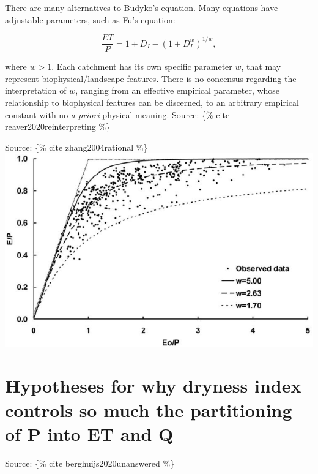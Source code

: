 \documentclass[
  letterpaper,
  DIV=11,
  numbers=noendperiod]{scrreprt}
\begin{document}
There are many alternatives to Budyko's equation. Many equations have
adjustable parameters, such as Fu's equation:

\[
\frac{ET}{P} = 1 + D_I - (1 + D_I^w)^{1/w},
\]

where \(w>1\). Each catchment has its own specific parameter \(w\), that
may represent biophysical/landscape features. There is no concensus
regarding the interpretation of \(w\), ranging from an effective
empirical parameter, whose relationship to biophysical features can be
discerned, to an arbitrary empirical constant with no \emph{a priori}
physical meaning. Source: \{\% cite reaver2020reinterpreting \%\}

Source: \{\% cite zhang2004rational \%\}\\
\includegraphics{archive/figures/zhang-2004-fig7.png}

\hypertarget{hypotheses-for-why-dryness-index-controls-so-much-the-partitioning-of-p-into-et-and-q}{%
\section{Hypotheses for why dryness index controls so much the
partitioning of P into ET and
Q}\label{hypotheses-for-why-dryness-index-controls-so-much-the-partitioning-of-p-into-et-and-q}}

Source: \{\% cite berghuijs2020unanswered \%\}
\end{document}
